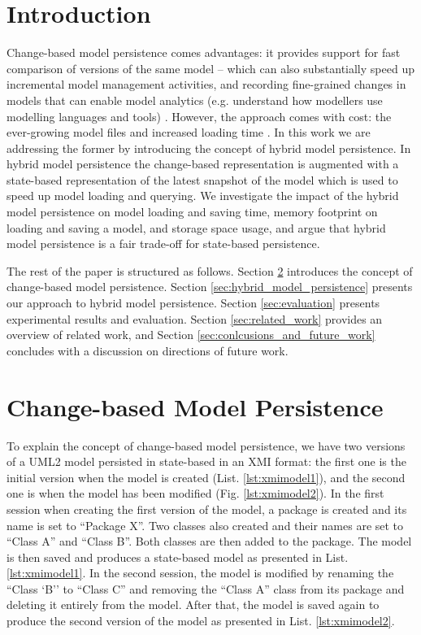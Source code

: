 \documentclass[10pt,conference]{IEEEtran}
\begin{document}
\section{Introduction}
\label{sec:introduction}
Change-based model persistence \cite{DBLP:conf/models/YohannisKP17} comes advantages: it provides support for fast comparison of versions of the same model \cite{DBLP:conf/sde/LippeO92,DBLP:conf/caise/IgnatN05,DBLP:conf/edoc/KoegelHLHD10,koegel2010emfstore}  -- which can also substantially speed up incremental model management activities, and recording fine-grained changes in models that can enable model analytics (e.g. understand how modellers use modelling languages and tools) \cite{DBLP:journals/entcs/RobbesL07}. However, the approach comes with cost: the ever-growing model files \cite{DBLP:conf/edoc/KoegelHLHD10,DBLP:journals/entcs/RobbesL07} and increased loading time \cite{mens2002state}. In this work we are addressing the former by introducing the concept of hybrid model persistence. In hybrid model persistence the change-based representation is augmented with a state-based representation of the latest snapshot of the model which is used to speed up model loading and querying. We investigate the impact of the hybrid model persistence on model loading and saving time, memory footprint on loading and saving a model, and storage space usage, and argue that hybrid model persistence is a fair trade-off for state-based persistence.
 
The rest of the paper is structured as follows. Section \ref{sec:change_based_model_persistence} introduces the concept of change-based model persistence. Section \ref{sec:hybrid_model_persistence} presents our approach to hybrid model persistence. Section \ref{sec:evaluation} presents experimental results and evaluation. Section \ref{sec:related_work} provides an overview of related work, and Section \ref{sec:conlcusions_and_future_work} concludes with a discussion on directions of future work.

\section{Change-based Model Persistence}
\label{sec:change_based_model_persistence}
To explain the concept of change-based model persistence, we have two versions of a UML2 \cite{eclipse2017uml2} model persisted in state-based in an XMI format: the first one is the initial version when the model is created (List. \ref{lst:xmimodel1}), and the second one is when the model has been modified (Fig. \ref{lst:xmimodel2}). In the first session when creating the first version of the model, a package is created and its name is set to ``Package X''. Two classes also created and their names are set to ``Class A'' and ``Class B''. Both classes are then added to the package. The model is then saved and produces a state-based model as presented in List. \ref{lst:xmimodel1}. In the second session, the model is modified by renaming the ``Class `B'' to ``Class C'' and removing the ``Class A'' class from its package and deleting it entirely from the model. After that, the model is saved again to produce the second version of the model as presented in List. \ref{lst:xmimodel2}.
\end{document}

